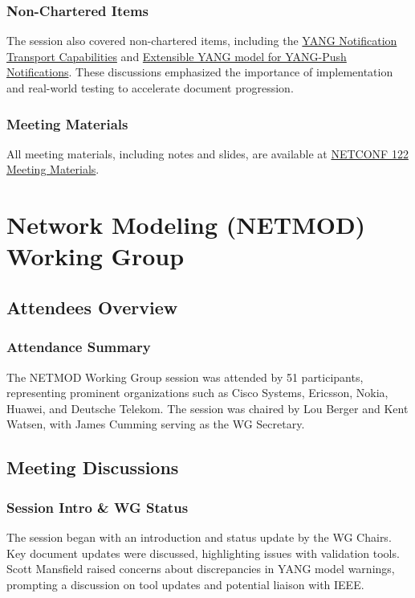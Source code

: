 \documentclass{article}
\begin{document}
\subsubsection{Non-Chartered Items}
The session also covered non-chartered items, including the \href{https://datatracker.ietf.org/doc/html/draft-netana-netconf-yp-transport-capabilities-01}{YANG Notification Transport Capabilities} and \href{https://datatracker.ietf.org/doc/html/draft-netana-netconf-notif-envelope-02}{Extensible YANG model for YANG-Push Notifications}. These discussions emphasized the importance of implementation and real-world testing to accelerate document progression.

\subsubsection{Meeting Materials}
All meeting materials, including notes and slides, are available at \href{https://datatracker.ietf.org/meeting/122/session/netconf}{NETCONF 122 Meeting Materials}.




\newpage

\section{Network Modeling (NETMOD) Working Group}

\subsection{Attendees Overview}
\subsubsection{Attendance Summary}
The NETMOD Working Group session was attended by 51 participants, representing prominent organizations such as Cisco Systems, Ericsson, Nokia, Huawei, and Deutsche Telekom. The session was chaired by Lou Berger and Kent Watsen, with James Cumming serving as the WG Secretary.

\subsection{Meeting Discussions}

\subsubsection{Session Intro \& WG Status}
The session began with an introduction and status update by the WG Chairs. Key document updates were discussed, highlighting issues with validation tools. Scott Mansfield raised concerns about discrepancies in YANG model warnings, prompting a discussion on tool updates and potential liaison with IEEE.
\end{document}
